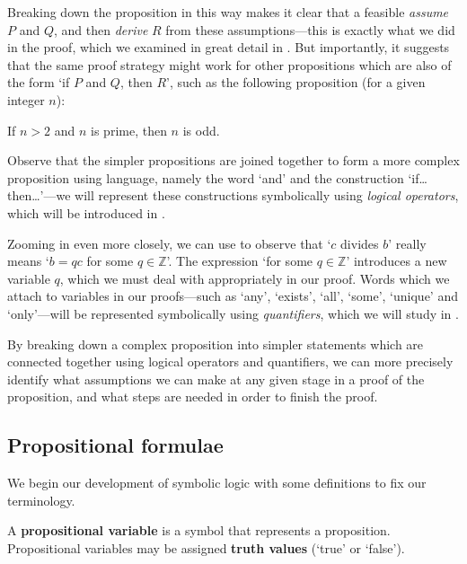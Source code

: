 Breaking down the proposition in this way makes it clear that a feasible \textit{assume} $P$ and $Q$, and then \textit{derive} $R$ from these assumptions---this is exactly what we did in the proof, which we examined in great detail in . But importantly, it suggests that the same proof strategy might work for other propositions which are also of the form `if $P$ and $Q$, then $R$', such as the following proposition (for a given integer $n$):

\begin{center}
If $n > 2$ and $n$ is prime, then $n$ is odd.
\end{center}

Observe that the simpler propositions are joined together to form a more complex proposition using language, namely the word `and' and the construction `if\dots{} then\dots{}'---we will represent these constructions symbolically using \textit{logical operators}, which will be introduced in .

Zooming in even more closely, we can use  to observe that `$c$ divides $b$' really means `$b = qc$ for some $q \in \mathbb{Z}$'. The expression `for some $q \in \mathbb{Z}$' introduces a new variable $q$, which we must deal with appropriately in our proof. Words which we attach to variables in our proofs---such as `any', `exists', `all', `some', `unique' and `only'---will be represented symbolically using \textit{quantifiers}, which we will study in .

By breaking down a complex proposition into simpler statements which are connected together using logical operators and quantifiers, we can more precisely identify what assumptions we can make at any given stage in a proof of the proposition, and what steps are needed in order to finish the proof.

\subsection*{Propositional formulae}

We begin our development of symbolic logic with some definitions to fix our terminology.

\begin{definition}
\label{defPropositionalVariable}
A \textbf{propositional variable} is a symbol that represents a proposition. Propositional variables may be assigned \textbf{truth values} (`true' or `false').
\end{definition}

